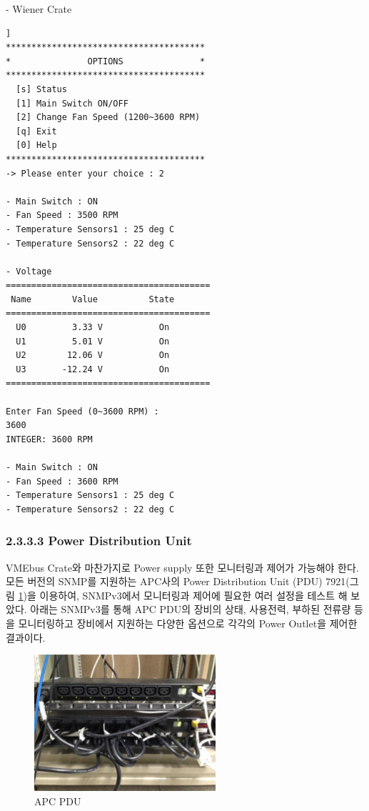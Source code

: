 \documentclass[11pt
  , a4paper
  , article
  , oneside
]{memoir}
\begin{document}
\clearpage
- Wiener Crate
\begin{lstlisting}[style=termstyle, caption=Wiener Crate 모니터링 및 제어결과]]
***************************************
*               OPTIONS               *
***************************************
  [s] Status                           
  [1] Main Switch ON/OFF               
  [2] Change Fan Speed (1200~3600 RPM) 
  [q] Exit                             
  [0] Help                             
***************************************
-> Please enter your choice : 2

- Main Switch : ON
- Fan Speed : 3500 RPM
- Temperature Sensors1 : 25 deg C
- Temperature Sensors2 : 22 deg C

- Voltage
========================================
 Name        Value          State
========================================
  U0         3.33 V           On
  U1         5.01 V           On
  U2        12.06 V           On
  U3       -12.24 V           On
========================================

Enter Fan Speed (0~3600 RPM) : 
3600
INTEGER: 3600 RPM

- Main Switch : ON
- Fan Speed : 3600 RPM
- Temperature Sensors1 : 25 deg C
- Temperature Sensors2 : 22 deg C
\end{lstlisting}

\clearpage
\subsubsection{2.3.3.3 Power Distribution Unit}
VMEbus Crate와 마찬가지로 Power supply 또한 모니터링과 제어가 가능해야 한다. 모든 버전의 SNMP를 지원하는 APC사의 Power Distribution Unit (PDU) 7921(그림 \ref{fig:apc_pdu})을 이용하여, SNMPv3에서 모니터링과 제어에 필요한 여러 설정을 테스트 해 보았다. 아래는 SNMPv3를 통해 APC PDU의 장비의 상태, 사용전력, 부하된 전류량 등을 모니터링하고 장비에서 지원하는 다양한 옵션으로 각각의 Power Outlet을 제어한 결과이다.
\begin{figure}[h]
  \centering
  \includegraphics[width=0.6\textwidth]{./images/apc_pdu.eps}
  \caption{APC PDU}
  \label{fig:apc_pdu}   
\end{figure}
\end{document}
